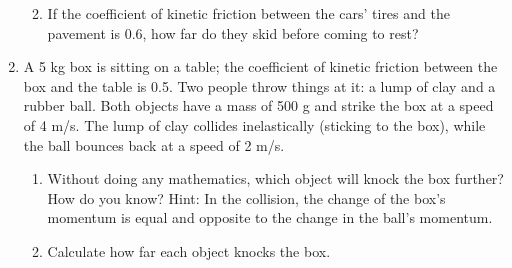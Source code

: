 \documentclass[12pt]{article}
\begin{document}
\begin{enumerate}
\begin{enumerate}
			\vspace{3in}
			
			\item{If the coefficient of kinetic friction between the cars' tires and the pavement is 0.6, how far do they skid before coming to rest?}
			
			\vspace{4in}
			
		\end{enumerate}
		
		\newpage
		
		
		\item{A 5 kg box is sitting on a table; the coefficient of kinetic friction between the box and the table is 0.5.
			Two people throw things at it: a lump of clay and a rubber ball. Both objects have a mass of 500 g and strike the box at a speed of 4 m/s. The lump of clay collides inelastically (sticking to the box), while the ball bounces back at a speed of 2 m/s.}
		\begin{enumerate}
			\item{Without doing any mathematics, which object will knock the box further? How do you know? Hint: In the collision, the change of the box's momentum is equal and opposite to the change in the ball's momentum.}
			\vspace{2in}
			\item{Calculate how far each object knocks the box.}
		\end{enumerate}
	\end{enumerate}
	
\end{document}
